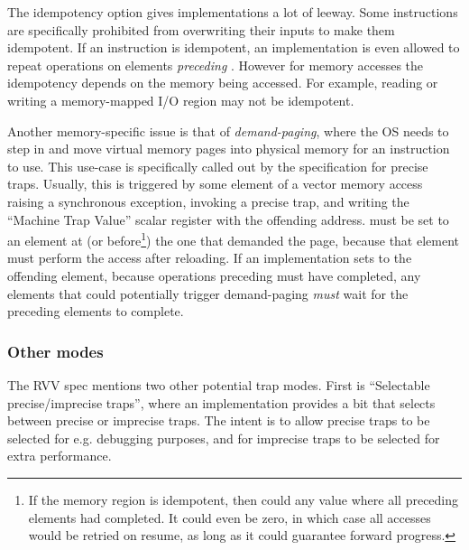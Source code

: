 The idempotency option gives implementations a lot of leeway.
Some instructions  are specifically prohibited from overwriting their inputs to make them idempotent.
If an instruction is idempotent, an implementation is even allowed to repeat operations on elements \emph{preceding} .
However for memory accesses the idempotency depends on the memory being accessed.
For example, reading or writing a memory-mapped I/O region may not be idempotent.

Another memory-specific issue is that of \emph{demand-paging}, where the OS needs to step in and move virtual memory pages into physical memory for an instruction to use.
This use-case is specifically called out by the specification for precise traps.
Usually, this is triggered by some element of a vector memory access raising a synchronous exception, invoking a precise trap, and writing the ``Machine Trap Value'' scalar register with the offending address\cite[Section 3.1.21]{specification-RISCV-vol2-20211203}.
 must be set to an element at (or before\footnote{If the memory region is idempotent, then  could any value where all preceding elements had completed. It could even be zero, in which case all accesses would be retried on resume, as long as it could guarantee forward progress.}) the one that demanded the page, because that element must perform the access after reloading.
If an implementation sets  to the offending element, because operations preceding  must have completed, any elements that could potentially trigger demand-paging \emph{must} wait for the preceding elements to complete.



\subsubsection{Other modes}
The RVV spec mentions two other potential trap modes.
First is \enquote{Selectable precise/imprecise traps}, where an implementation provides a bit that selects between precise or imprecise traps.
The intent is to allow precise traps to be selected for e.g. debugging purposes, and for imprecise traps to be selected for extra performance.


